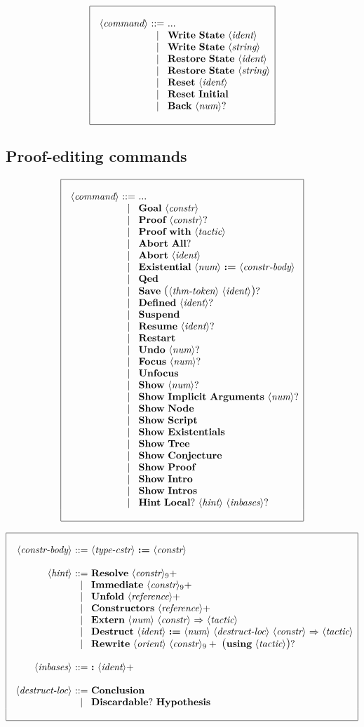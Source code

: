 \documentclass{article}
\makeatletter
\def\GR#1{\text{\large(}#1\text{\large)}}
\def\NT#1{\langle\textit{#1}\rangle}
\def\NTL#1#2{\langle\textit{#1}\rangle_{#2}}
\def\TERM#1{{\bf\textrm{\bf #1}}}
\def\KWD#1{\TERM{#1}}
\def\PLUS#1{#1+}
\def\OPT#1{#1?}
\def\OPTGR#1{\GR{#1}?}
\newenvironment{cadre}
        {\begin{array}{|c|}\hline\\}
        {\\\\\hline\end{array}}
\newenvironment{rulebox}
        {$$\begin{cadre}\begin{array}{r@{~}c@{~}l@{}l@{}r}}
        {\end{array}\end{cadre}$$}
\def\DEFNT#1{\NT{#1} & ::= &}
\def\EXTNT#1{\NT{#1} & ::= & ... \\&|&}
\def\SEPDEF{\\\\}
\def\nlsep{\\&|&}
\newenvironment{rules}
        {\begin{center}\begin{rulebox}}
        {\end{rulebox}\end{center}}
\makeatother
\begin{document}
\begin{rules}
\EXTNT{command}
       \TERM{Write}~\TERM{State}~\NT{ident}
\nlsep \TERM{Write}~\TERM{State}~\NT{string}
\nlsep \TERM{Restore}~\TERM{State}~\NT{ident}
\nlsep \TERM{Restore}~\TERM{State}~\NT{string}
\nlsep \TERM{Reset}~\NT{ident}
\nlsep \TERM{Reset}~\TERM{Initial}
\nlsep \TERM{Back}~\OPT{\NT{num}}
\end{rules}

\subsection{Proof-editing commands}

\begin{rules}
\EXTNT{command}
       \TERM{Goal}~\NT{constr}
\nlsep \TERM{Proof}~\OPT{\NT{constr}}
\nlsep \TERM{Proof}~\KWD{with}~\NT{tactic}
\nlsep \TERM{Abort}~\OPT{\TERM{All}}
\nlsep \TERM{Abort}~\NT{ident}
\nlsep \TERM{Existential}~\NT{num}~\KWD{:=}~\NT{constr-body}
\nlsep \TERM{Qed}
\nlsep \TERM{Save}~\OPTGR{\NT{thm-token}~\NT{ident}}
\nlsep \TERM{Defined}~\OPT{\NT{ident}}
\nlsep \TERM{Suspend}
\nlsep \TERM{Resume}~\OPT{\NT{ident}}
\nlsep \TERM{Restart}
\nlsep \TERM{Undo}~\OPT{\NT{num}}
\nlsep \TERM{Focus}~\OPT{\NT{num}}
\nlsep \TERM{Unfocus}
\nlsep \TERM{Show}~\OPT{\NT{num}}
\nlsep \TERM{Show}~\TERM{Implicit}~\TERM{Arguments}~\OPT{\NT{num}}
\nlsep \TERM{Show}~\TERM{Node}
\nlsep \TERM{Show}~\TERM{Script}
\nlsep \TERM{Show}~\TERM{Existentials}
\nlsep \TERM{Show}~\TERM{Tree}
\nlsep \TERM{Show}~\TERM{Conjecture}
\nlsep \TERM{Show}~\TERM{Proof}
\nlsep \TERM{Show}~\TERM{Intro}
\nlsep \TERM{Show}~\TERM{Intros}
\nlsep \TERM{Hint}~\OPT{\TERM{Local}}~\NT{hint}~\OPT{\NT{inbases}}
\end{rules}


\begin{rules}
\DEFNT{constr-body}
       \NT{type-cstr}~\KWD{:=}~\NT{constr}
\SEPDEF
\DEFNT{hint}
       \TERM{Resolve}~\PLUS{\NTL{constr}{9}}
\nlsep \TERM{Immediate}~\PLUS{\NTL{constr}{9}}
\nlsep \TERM{Unfold}~\PLUS{\NT{reference}}
\nlsep \TERM{Constructors}~\PLUS{\NT{reference}}
\nlsep \TERM{Extern}~\NT{num}~\NT{constr}~\KWD{$\Rightarrow$}~\NT{tactic}
\nlsep \TERM{Destruct}~\NT{ident}~\KWD{:=}~\NT{num}~\NT{destruct-loc}
       ~\NT{constr}~\KWD{$\Rightarrow$}~\NT{tactic}
\nlsep \TERM{Rewrite}~\NT{orient}~\PLUS{\NTL{constr}{9}}
       ~\OPTGR{\KWD{using}~\NT{tactic}}
\SEPDEF
\DEFNT{inbases}
       \KWD{:}~\PLUS{\NT{ident}}
\SEPDEF
\DEFNT{destruct-loc}
       \TERM{Conclusion}
\nlsep \OPT{\TERM{Discardable}}~\TERM{Hypothesis}
\end{rules}
\end{document}
